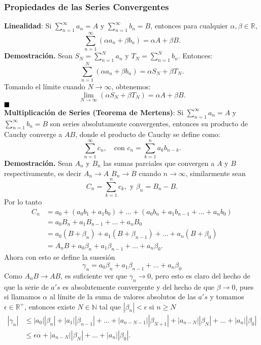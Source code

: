 \documentclass[letterpaper]{book}
\newcommand{\nat}{\ensuremath{ \mathbb N }}
\newcommand{\dem}{{\noindent \sc \textbf{Demostraci\'on. }}}
\newcommand{\QED}{\ensuremath{\hspace*{0em plus 1fill}\blacksquare}}
\newcommand{\re}{\ensuremath{\mathbb R }}
\begin{document}
\subsubsection{Propiedades de las Series Convergentes}
\noindent\textbf{Linealidad}:
Si \(\sum_{n=1}^\infty a_n = A\) y \(\sum_{n=1}^\infty b_n = B\), entonces para cualquier \(\alpha, \beta \in \mathbb{R}\),
\[
\sum_{n=1}^\infty (\alpha a_n + \beta b_n) = \alpha A + \beta B.
\]
\dem Sean \(S_N = \sum_{n=1}^N a_n\) y \(T_N = \sum_{n=1}^N b_n\). Entonces:
\[
\sum_{n=1}^N (\alpha a_n + \beta b_n) = \alpha S_N + \beta T_N.
\]
Tomando el límite cuando \(N \to \infty\), obtenemos:
\[
\lim_{N \to \infty} \left( \alpha S_N + \beta T_N \right) = \alpha A + \beta B.
\]
\QED\\
\noindent\textbf{Multiplicación de Series (Teorema de Mertens)}:
Si \(\sum_{n=1}^\infty a_n = A\) y \(\sum_{n=1}^\infty b_n = B\) son series absolutamente convergentes, entonces su producto de Cauchy converge a \(AB\), donde el producto de Cauchy se define como:
\[
\sum_{n=1}^\infty c_n, \quad \text{con } c_n = \sum_{k=1}^n a_k b_{n-k}.
\]
\dem Sean \(A_n\) y \(B_n\) las sumas parciales que convergen a \(A\) y \(B\) respectivamente, es decir \(A_n\to A\) \(B_n\to B\) cuando \(n\to\infty\), similarmente sean
\[
C_n=\sum_{k=1}^n c_k,  \text{ y }\beta_n=B_n-B.
\]
\noindent Por lo tanto
\begin{align*}
C_n&=a_0+(a_0b_1+a_1b_0)+\dots+(a_0b_n+a_1b_{n-1}+\dots+a_nb_0)\\
    &=a_0B_n+a_1B_{n-1}+\dots+a_nB_0\\
    &=a_0(B+\beta_n)+a_1(B+\beta_{n-1})+\dots+a_n(B+\beta_0)\\
    &=A_nB+a_0\beta_n+a_1\beta_{n-1}+\dots+a_n\beta_0.
\end{align*}
Ahora con esto se define la susesión
\[
\gamma_n=a_0\beta_n+a_1\beta_{n-1}+\dots+a_n\beta_0
\]
Como \(A_nB\to AB\), es suficiente ver que \(\gamma_n\to0\), pero esto es claro del hecho de que la serie de \(a's\) es absolutemente convergente y del hecho de que \(\beta\to0\), pues si llamamos \(\alpha\) al límite de la suma de valores absolutos de las \(a's\) y tomamos \(\epsilon\in\re^{+}\), entonces  existe \(N\in\nat\) tal que \(|\beta_n|<\epsilon\) si \(n\geq N\)
\begin{align*}
|\gamma_n|&\leq |a_0||\beta_n|+|a_1||\beta_{n-1}|+\dots +|a_{n-N-1}||\beta_{N+1}| +|a_{n-N}||\beta_{N}|+\dots+|a_n||\beta_0|\\
        &\leq \epsilon\alpha +|a_{n-N}||\beta_{N}|+\dots+|a_n||\beta_0|.
\end{align*}
\end{document}
